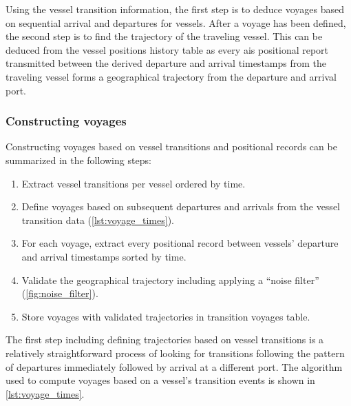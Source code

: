 Using the vessel transition information, the first step is to deduce voyages based on sequential arrival and departures for vessels. After a voyage has been defined, the second step is to find the trajectory of the traveling vessel. This can be deduced from the vessel positions history table as every \acrshort{ais} positional report transmitted between the derived departure and arrival timestamps from the traveling vessel forms a geographical trajectory from the departure and arrival port.

\subsubsection{Constructing voyages}

Constructing voyages based on vessel transitions and positional records can be summarized in the following steps:

\begin{enumerate}
    \item Extract vessel transitions per vessel ordered by time.
    \item Define voyages based on subsequent departures and arrivals from the vessel transition data (\cref{lst:voyage_times}).
    \item For each voyage, extract every positional record between vessels' departure and arrival timestamps sorted by time.
    \item Validate the geographical trajectory including applying a ``noise filter'' (\cref{fig:noise_filter}).
    \item Store voyages with validated trajectories in transition voyages table.
\end{enumerate}

The first step including defining trajectories based on vessel transitions is a relatively straightforward process of looking for transitions following the pattern of departures immediately followed by arrival at a different port. The algorithm used to compute voyages based on a vessel's transition events is shown in \cref{lst:voyage_times}.

